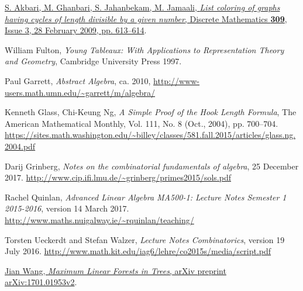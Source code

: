 \documentclass[numbers=enddot,12pt,final,onecolumn,notitlepage]{scrartcl}%
\theoremstyle{definition}
\begin{document}
\begin{thebibliography}{9999999999}                                                                                       %

\href{http://www.sciencedirect.com/science/article/pii/S0012365X08005244}{S. Akbari, M. Ghanbari, S. Jahanbekam, M. Jamaali, \textit{List coloring of graphs having cycles of length divisible by a given number}, Discrete Mathematics \textbf{309}, Issue 3, 28 February 2009, pp. 613--614}.

William Fulton, \textit{Young Tableaux: With
Applications to Representation Theory and Geometry}, Cambridge University
Press 1997.

Paul Garrett,
\textit{Abstract Algebra},
ca. 2010,
\newline\url{http://www-users.math.umn.edu/~garrett/m/algebra/}

Kenneth Glass, Chi-Keung Ng,
\textit{A Simple Proof of the Hook Length Formula},
The American Mathematical Monthly,
Vol. 111, No. 8 (Oct., 2004), pp. 700--704.
\newline\url{https://sites.math.washington.edu/~billey/classes/581.fall.2015/articles/glass.ng.2004.pdf}

Darij Grinberg, \textit{Notes on the combinatorial
fundamentals of algebra}, 25 December 2017.
\newline\url{http://www.cip.ifi.lmu.de/~grinberg/primes2015/sols.pdf}

Rachel Quinlan,
\textit{Advanced Linear Algebra MA500-1: Lecture Notes
Semester 1 2015-2016},
version 14 March 2017.
\newline\url{http://www.maths.nuigalway.ie/~rquinlan/teaching/}

Torsten Ueckerdt and Stefan Walzer,
\textit{Lecture Notes Combinatorics},
version 19 July 2016.
\newline\url{http://www.math.kit.edu/iag6/lehre/co2015s/media/script.pdf}

\href{http://lanl.arxiv.org/abs/1701.01953v2}{Jian Wang,
\textit{Maximum Linear Forests in Trees},
arXiv preprint arXiv:1701.01953v2}.

\end{thebibliography}
\end{document}
